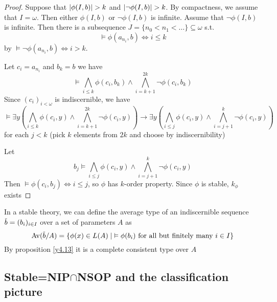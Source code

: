 \documentclass[11pt]{article}
\begin{document}
\begin{proof}
Suppose that \(\abs{\phi(I,b)}>k\) and \(\abs{\neg\phi(I,b)}>k\). By compactness, we assume
that \(I=\omega\). Then either \(\phi(I,b)\) or \(\neg\phi(I,b)\) is infinite. Assume that \(\neg\phi(I,b)\) is
infinite. Then there is a subsequence \(J=\{n_0<n_1<\dots\}\subseteq\omega\)  s.t.
\begin{equation*}
\vDash\phi(a_{n_i},b)\Leftrightarrow i\le k
\end{equation*}
by \(\vDash\neg\phi(a_{n_i},b)\Leftrightarrow i>k\).

Let \(c_i=a_{n_i}\) and \(b_k=b\) we have
\begin{equation*}
\vDash\bigwedge_{i\le k}\phi(c_i,b_k)\wedge\bigwedge_{i=k+1}^{2k}\neg\phi(c_i,b_k)
\end{equation*}
Since \((c_i)_{i<\omega}\) is indiscernible, we have
\begin{equation*}
\vDash\exists y\left(
\bigwedge_{i\le k}\phi(c_i,y)\wedge\bigwedge_{i=k+1}^{2k}\neg\phi(c_i,y) \right)\to\exists y
\left( \bigwedge_{i\le j}\phi(c_i,y)\wedge\bigwedge_{i=j+1}^k\neg\phi(c_i,y) \right)
\end{equation*}
for each \(j<k\) (pick \(k\) elements from \(2k\) and choose by indiscernibility)

Let
\begin{equation*}
b_j\vDash\bigwedge_{i\le j}\phi(c_i,y)\wedge\bigwedge_{i=j+1}^k\neg\phi(c_i,y)
\end{equation*}
Then \(\vDash\phi(c_i,b_j)\Leftrightarrow i\le j\), so \(\phi\) has \(k\)-order property. Since \(\phi\) is stable, \(k_\phi\) exists
\end{proof}

\begin{corollary}[]
In a stable theory, we can define the average type of an indiscernible
sequence \(\barb=(b_i)_{i\in I}\) over a set of parameters \(A\) as
\begin{equation*}
\Av(\barb/A)=\{\phi(x)\in L(A)\mid\;\vDash\phi(b_i)\text{ for all but finitely many }i\in I\}
\end{equation*}
By proposition \ref{y4.13} it is a complete consistent type over \(A\)
\end{corollary}


\subsection{Stable=NIP\texorpdfstring{\(\cap\)}{∩}NSOP and the classification picture}
\label{sec:org8600224}
\end{document}
